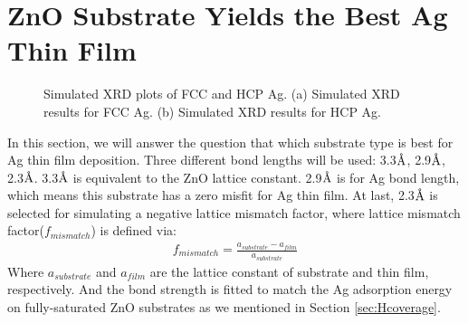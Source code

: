 \section{ZnO Substrate Yields the Best Ag Thin Film}

\begingroup
\begin{figure}[ht]
  \centering
  \label{Chap:Ag/ZnO:fig:4a}
  \label{Chap:Ag/ZnO:fig:4b}
\caption[Simulated XRD plots of FCC and HCP Ag]{Simulated XRD plots of FCC and HCP Ag. (a) Simulated XRD results for FCC Ag. (b) Simulated XRD results for HCP Ag.}
  \label{Chap:Ag/ZnO:fig4}
\end{figure}
\endgroup

In this section, we will answer the question that which substrate type is best for Ag thin film deposition. Three different bond lengths will be used: 3.3$\mbox{\normalfont\AA}$, 2.9$\mbox{\normalfont\AA}$, 2.3$\mbox{\normalfont\AA}$. 3.3$\mbox{\normalfont\AA}$ is equivalent to the ZnO lattice constant. 2.9$\mbox{\normalfont\AA}$ is for Ag bond length, which means this substrate has a zero misfit for Ag thin film. At last, 2.3$\mbox{\normalfont\AA}$ is selected for simulating a negative lattice mismatch factor, where lattice mismatch factor($f_{mismatch}$) is defined via:
\begin{align}
    f_{mismatch} = \frac{a_{substrate} - a_{film}}{a_{substrate}}
    \label{Chap:Ag/ZnO:eq:mismatch}
\end{align}
Where $a_{substrate}$ and $a_{film}$ are the lattice constant of substrate and thin film, respectively. And the bond strength is fitted to match the Ag adsorption energy on fully-saturated ZnO substrates as we mentioned in Section \ref{sec:Hcoverage}.

